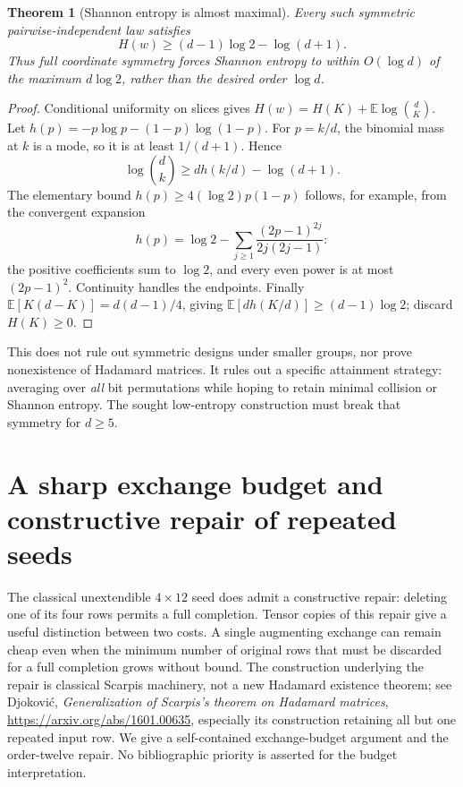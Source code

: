 \documentclass[11pt]{article}
\newtheorem{theorem}{Theorem}[section]
\begin{document}
\begin{theorem}[Shannon entropy is almost maximal]
\label{thm:symmetry-shannon}
Every such symmetric pairwise-independent law satisfies
\[
 H(w)\ge(d-1)\log2-\log(d+1).
\]
Thus full coordinate symmetry forces Shannon entropy to within
$O(\log d)$ of the maximum $d\log2$, rather than the desired
order $\log d$.
\end{theorem}
\begin{proof}
Conditional uniformity on slices gives
$H(w)=H(K)+\mathbb E\log\binom dK$.
Let $h(p)=-p\log p-(1-p)\log(1-p)$. For $p=k/d$, the binomial
mass at $k$ is a mode, so it is at least $1/(d+1)$. Hence
\[
 \log\binom dk\ge d h(k/d)-\log(d+1).
\]
The elementary bound $h(p)\ge4(\log2)p(1-p)$ follows, for example,
from the convergent expansion
\[
 h(p)=\log2-\sum_{j\ge1}
           \frac{(2p-1)^{2j}}{2j(2j-1)}:
\]
the positive coefficients sum to $\log2$, and every even power is
at most $(2p-1)^2$. Continuity handles the endpoints.
Finally $\mathbb E[K(d-K)]=d(d-1)/4$, giving
$\mathbb E[d h(K/d)]\ge(d-1)\log2$; discard $H(K)\ge0$.
\end{proof}

This does not rule out symmetric designs under smaller groups, nor
prove nonexistence of Hadamard matrices. It rules out a specific
attainment strategy: averaging over \emph{all} bit permutations while
hoping to retain minimal collision or Shannon entropy. The sought
low-entropy construction must break that symmetry for $d\ge5$.
\section{A sharp exchange budget and constructive repair of repeated seeds}
\label{sec:completion-budget}

The classical unextendible $4\times12$ seed does admit a constructive
repair: deleting one of its four rows permits a full completion.
Tensor copies of this repair give a useful distinction between two
costs. A single augmenting exchange can remain cheap even when the
minimum number of original rows that must be discarded for a full
completion grows without bound. The construction underlying the repair
is classical Scarpis machinery, not a new Hadamard existence theorem;
see Djokovi\'c, \emph{Generalization of Scarpis's theorem on Hadamard
matrices}, \url{https://arxiv.org/abs/1601.00635}, especially its
construction retaining all but one repeated input row. We give a
self-contained exchange-budget argument and the order-twelve repair.
No bibliographic priority is asserted for the budget interpretation.
\end{document}
